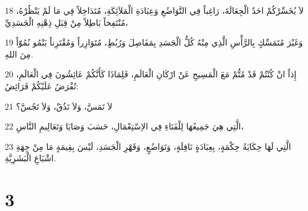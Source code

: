 \par 18 لاَ يُخَسِّرْكُمْ احَدٌ الْجِعَالَةَ، رَاغِباً فِي التَّوَاضُعِ وَعِبَادَةِ الْمَلاَئِكَةِ، مُتَدَاخِلاً فِي مَا لَمْ يَنْظُرْهُ، مُنْتَفِخاً بَاطِلاً مِنْ قِبَلِ ذِهْنِهِ الْجَسَدِيِّ،
\par 19 وَغَيْرَ مُتَمَسِّكٍ بِالرَّأْسِ الَّذِي مِنْهُ كُلُّ الْجَسَدِ بِمَفَاصِلَ وَرُبُطٍ، مُتَوَازِراً وَمُقْتَرِناً يَنْمُو نُمُوّاً مِنَ اللهِ.
\par 20 إِذاً انْ كُنْتُمْ قَدْ مُتُّمْ مَعَ الْمَسِيحِ عَنْ ارْكَانِ الْعَالَمِ، فَلِمَاذَا كَأَنَّكُمْ عَائِشُونَ فِي الْعَالَمِ، تُفْرَضُ عَلَيْكُمْ فَرَائِضُ:
\par 21 لاَ تَمَسَّ، وَلاَ تَذُقْ، وَلاَ تَجُسَّ؟
\par 22 الَّتِي هِيَ جَمِيعُهَا لِلْفَنَاءِ فِي الاِسْتِعْمَالِ، حَسَبَ وَصَايَا وَتَعَالِيمِ النَّاسِ،
\par 23 الَّتِي لَهَا حِكَايَةُ حِكْمَةٍ، بِعِبَادَةٍ نَافِلَةٍ، وَتَوَاضُعٍ، وَقَهْرِ الْجَسَدِ، لَيْسَ بِقِيمَةٍ مَا مِنْ جِهَةِ اشْبَاعِ الْبَشَرِيَّةِ.

\chapter{3}

